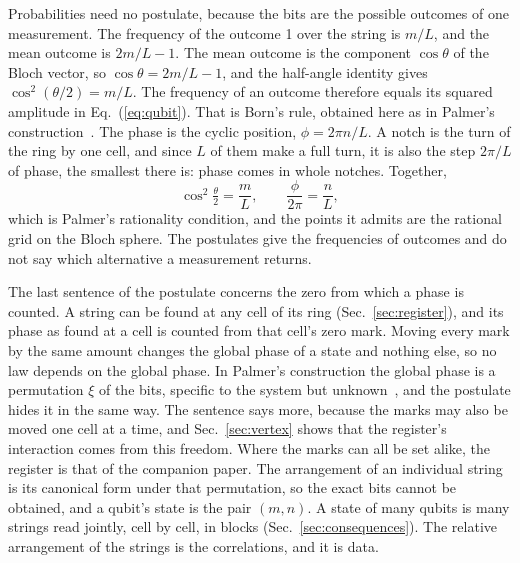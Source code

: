 \documentclass[aps,prd,twocolumn,superscriptaddress,nofootinbib]{revtex4-2}
\begin{document}
Probabilities need no postulate, because the bits are the possible outcomes of one measurement. The frequency of the outcome 1 over the string is $m/L$, and the mean outcome is $2m/L - 1$. The mean outcome is the component $\cos\theta$ of the Bloch vector, so $\cos\theta = 2m/L - 1$, and the half-angle identity gives $\cos^2(\theta/2) = m/L$. The frequency of an outcome therefore equals its squared amplitude in Eq.~(\ref{eq:qubit}). That is Born's rule, obtained here as in Palmer's construction~\cite{palmer2026}. The phase is the cyclic position, $\phi = 2\pi n/L$. A notch is the turn of the ring by one cell, and since $L$ of them make a full turn, it is also the step $2\pi/L$ of phase, the smallest there is: phase comes in whole notches. Together,
\begin{equation}
\cos^2\tfrac{\theta}{2} = \frac{m}{L},\qquad \frac{\phi}{2\pi} = \frac{n}{L},
\label{eq:raqm}
\end{equation}
which is Palmer's rationality condition, and the points it admits are the rational grid on the Bloch sphere. The postulates give the frequencies of outcomes and do not say which alternative a measurement returns.

The last sentence of the postulate concerns the zero from which a phase is counted. A string can be found at any cell of its ring (Sec.~\ref{sec:register}), and its phase as found at a cell is counted from that cell's zero mark. Moving every mark by the same amount changes the global phase of a state and nothing else, so no law depends on the global phase. In Palmer's construction the global phase is a permutation $\xi$ of the bits, specific to the system but unknown~\cite{palmer2026c}, and the postulate hides it in the same way. The sentence says more, because the marks may also be moved one cell at a time, and Sec.~\ref{sec:vertex} shows that the register's interaction comes from this freedom. Where the marks can all be set alike, the register is that of the companion paper. The arrangement of an individual string is its canonical form under that permutation, so the exact bits cannot be obtained, and a qubit's state is the pair $(m,n)$. A state of many qubits is many strings read jointly, cell by cell, in blocks (Sec.~\ref{sec:consequences}). The relative arrangement of the strings is the correlations, and it is data.
\end{document}
